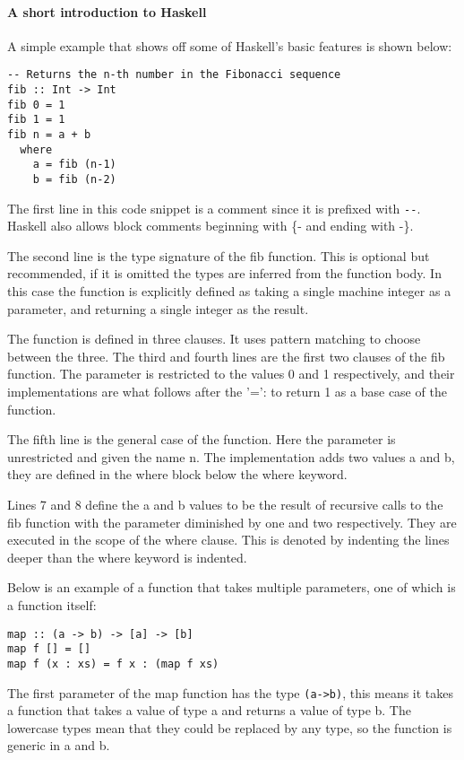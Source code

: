 \paragraph{A short introduction to Haskell}
A simple example that shows off some of Haskell's basic features is shown below:

\begin{lstlisting}[caption={Fibonacci}]
-- Returns the n-th number in the Fibonacci sequence
fib :: Int -> Int
fib 0 = 1
fib 1 = 1
fib n = a + b
  where
    a = fib (n-1)
    b = fib (n-2)
\end{lstlisting}

The first line in this code snippet is a comment since it is prefixed with \lstinline{--}. Haskell also allows block comments beginning with \{- and ending with -\}.

The second line is the type signature of the fib function. This is optional but recommended, if it is omitted the types are inferred from the function body. In this case the function is explicitly defined as taking a single machine integer as a parameter, and returning a single integer as the result. 

The function is defined in three clauses. It uses pattern matching to choose between the three. 
The third and fourth lines are the first two clauses of the fib function. The parameter is restricted to the values 0 and 1 respectively, and their implementations are what follows after the '=': to return 1 as a base case of the function.

The fifth line is the general case of the function. Here the parameter is unrestricted and given the name n. The implementation adds two values a and b, they are defined in the where block below the where keyword.

Lines 7 and 8 define the a and b values to be the result of recursive calls to the fib function with the parameter diminished by one and two respectively. They are executed in the scope of the where clause. This is denoted by indenting the lines deeper than the where keyword is indented.

Below is an example of a function that takes multiple parameters, one of which is a function itself:

\begin{lstlisting}[caption={The map function}]
map :: (a -> b) -> [a] -> [b]
map f [] = []
map f (x : xs) = f x : (map f xs)
\end{lstlisting}

The first parameter of the map function has the type \lstinline{(a->b)}, this means it takes a function that takes a value of type a and returns a value of type b. 
The lowercase types mean that they could be replaced by any type, so the function is generic in a and b.

